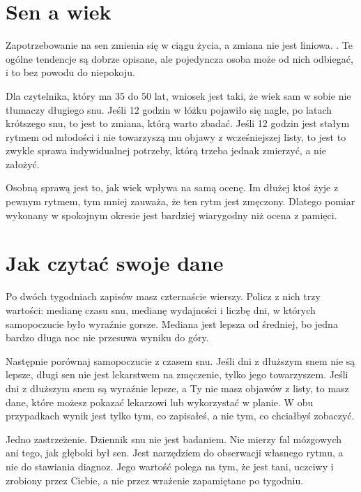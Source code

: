 \section{Sen a wiek}

Zapotrzebowanie na sen zmienia się w ciągu życia, a zmiana nie jest liniowa. . Te ogólne tendencje są dobrze opisane, ale pojedyncza osoba może od nich odbiegać, i to bez powodu do niepokoju.

Dla czytelnika, który ma 35 do 50 lat, wniosek jest taki, że wiek sam w sobie nie tłumaczy długiego snu. Jeśli 12 godzin w łóżku pojawiło się nagle, po latach krótszego snu, to jest to zmiana, którą warto zbadać. Jeśli 12 godzin jest stałym rytmem od młodości i nie towarzyszą mu objawy z wcześniejszej listy, to jest to zwykle sprawa indywidualnej potrzeby, którą trzeba jednak zmierzyć, a nie założyć.

Osobną sprawą jest to, jak wiek wpływa na samą ocenę. Im dłużej ktoś żyje z pewnym rytmem, tym mniej zauważa, że ten rytm jest zmęczony. Dlatego pomiar wykonany w spokojnym okresie jest bardziej wiarygodny niż ocena z pamięci.

\section{Jak czytać swoje dane}

Po dwóch tygodniach zapisów masz czternaście wierszy. Policz z nich trzy wartości: medianę czasu snu, medianę wydajności i liczbę dni, w których samopoczucie było wyraźnie gorsze. Mediana jest lepsza od średniej, bo jedna bardzo długa noc nie przesuwa wyniku do góry.

Następnie porównaj samopoczucie z czasem snu. Jeśli dni z dłuższym snem nie są lepsze, długi sen nie jest lekarstwem na zmęczenie, tylko jego towarzyszem. Jeśli dni z dłuższym snem są wyraźnie lepsze, a Ty nie masz objawów z listy, to masz dane, które możesz pokazać lekarzowi lub wykorzystać w planie. W obu przypadkach wynik jest tylko tym, co zapisałeś, a nie tym, co chciałbyś zobaczyć.

Jedno zastrzeżenie. Dziennik snu nie jest badaniem. Nie mierzy fal mózgowych ani tego, jak głęboki był sen. Jest narzędziem do obserwacji własnego rytmu, a nie do stawiania diagnoz. Jego wartość polega na tym, że jest tani, uczciwy i zrobiony przez Ciebie, a nie przez wrażenie zapamiętane po tygodniu.

